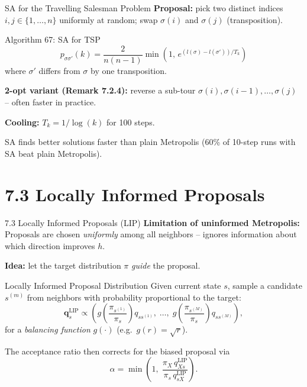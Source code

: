 \documentclass[aspectratio=169,10pt]{beamer}
\begin{document}
\begin{frame}{SA for the Travelling Salesman Problem}
  \textbf{Proposal:} pick two distinct indices $i,j \in \{1,\ldots,n\}$
  uniformly at random; swap $\sigma(i)$ and $\sigma(j)$
  (transposition).

  \begin{block}{Algorithm 67: SA for TSP}
    \[
      p_{\sigma\sigma'}(k)
      = \frac{2}{n(n-1)}\min\!\left(1,\, e^{(l(\sigma)-l(\sigma'))/T_k}\right)
    \]
    where $\sigma'$ differs from $\sigma$ by one transposition.
  \end{block}

  \textbf{2-opt variant (Remark 7.2.4):} reverse a sub-tour
  $\sigma(i), \sigma(i-1), \ldots, \sigma(j)$ -- often faster in practice.

  \medskip
  \textbf{Cooling:} $T_k = 1/\log(k)$ for 100 steps.

  \medskip
  SA finds better solutions faster than plain Metropolis (60\% of 10-step
  runs with SA beat plain Metropolis).
\end{frame}

\section{7.3 Locally Informed Proposals}

\begin{frame}{7.3 Locally Informed Proposals (LIP)}
  \textbf{Limitation of uninformed Metropolis:}
  Proposals are chosen \emph{uniformly} among all neighbors -- ignores
  information about which direction improves $h$.

  \medskip
  \textbf{Idea:} let the target distribution $\pi$ \emph{guide} the proposal.

  \begin{block}{Locally Informed Proposal Distribution}
    Given current state $s$, sample a candidate $s^{(m)}$ from neighbors
    with probability proportional to the target:
    \[
      \mathbf{q}^{\mathrm{LIP}}_s
      \propto
      \left(
        g\!\left(\frac{\pi_{s^{(1)}}}{\pi_s}\right) q_{s s^{(1)}},\;
        \ldots,\;
        g\!\left(\frac{\pi_{s^{(M)}}}{\pi_s}\right) q_{s s^{(M)}}
      \right),
    \]
    for a \emph{balancing function} $g(\cdot)$ (e.g.\ $g(r) = \sqrt{r}$).
  \end{block}

  The acceptance ratio then corrects for the biased proposal via
  \[
    \alpha = \min\!\left(1,\;
      \frac{\pi_X\, q^{\mathrm{LIP}}_{Xs}}{\pi_s\, q^{\mathrm{LIP}}_{sX}}
    \right).
  \]
\end{frame}
\end{document}
